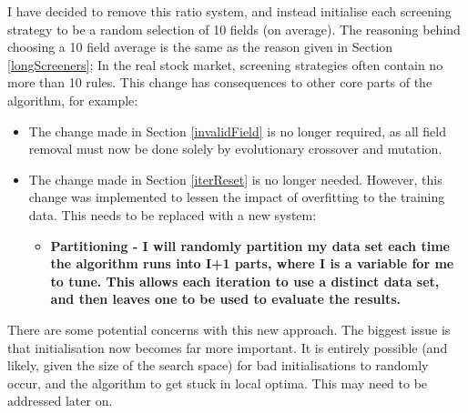I have decided to remove this ratio system, and instead initialise each screening strategy to be a random selection of 10 fields (on average). The reasoning behind choosing a 10 field average is the same as the reason given in Section \ref{longScreeners}; In the real stock market, screening strategies often contain no more than 10 rules. This change has consequences to other core parts of the algorithm, for example:
\begin{itemize}
    \item The change made in Section \ref{invalidField} is no longer required, as all field removal must now be done solely by evolutionary crossover and mutation.
    \item The change made in Section \ref{iterReset} is no longer needed. However, this change was implemented to lessen the impact of overfitting to the training data. This needs to be replaced with a new system:
    \begin{itemize}
        \item \bf Partitioning \rm - I will randomly partition my data set each time the algorithm runs into I+1 parts, where I is a variable for me to tune. This allows each iteration to use a distinct data set, and then leaves one to be used to evaluate the results.
    \end{itemize}
\end{itemize}

There are some potential concerns with this new approach. The biggest issue is that initialisation now becomes far more important. It is entirely possible (and likely, given the size of the search space) for bad initialisations to randomly occur, and the algorithm to get stuck in local optima. This may need to be addressed later on.